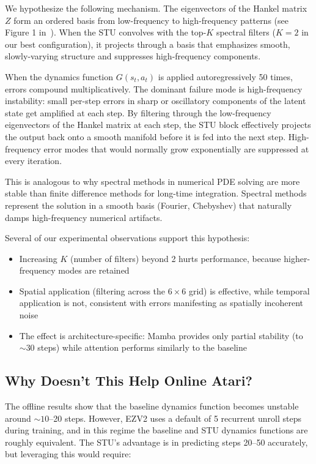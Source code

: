 \documentclass[10pt,twocolumn]{IEEEtran}
\begin{document}
We hypothesize the following mechanism. The eigenvectors of the Hankel matrix $Z$ form an ordered basis from low-frequency to high-frequency patterns (see Figure 1 in~\cite{agarwal2023spectral}). When the STU convolves with the top-$K$ spectral filters ($K=2$ in our best configuration), it projects through a basis that emphasizes smooth, slowly-varying structure and suppresses high-frequency components.

When the dynamics function $G(s_t, a_t)$ is applied autoregressively 50 times, errors compound multiplicatively. The dominant failure mode is high-frequency instability: small per-step errors in sharp or oscillatory components of the latent state get amplified at each step. By filtering through the low-frequency eigenvectors of the Hankel matrix at each step, the STU block effectively projects the output back onto a smooth manifold before it is fed into the next step. High-frequency error modes that would normally grow exponentially are suppressed at every iteration.

This is analogous to why spectral methods in numerical PDE solving are more stable than finite difference methods for long-time integration. Spectral methods represent the solution in a smooth basis (Fourier, Chebyshev) that naturally damps high-frequency numerical artifacts.

Several of our experimental observations support this hypothesis:
\begin{itemize}
    \item Increasing $K$ (number of filters) beyond 2 hurts performance, because higher-frequency modes are retained
    \item Spatial application (filtering across the $6 \times 6$ grid) is effective, while temporal application is not, consistent with errors manifesting as spatially incoherent noise
    \item The effect is architecture-specific: Mamba provides only partial stability (to ${\sim}30$ steps) while attention performs similarly to the baseline
\end{itemize}

\subsection{Why Doesn't This Help Online Atari?}

The offline results show that the baseline dynamics function becomes unstable around ${\sim}10$--20 steps. However, EZV2 uses a default of 5 recurrent unroll steps during training, and in this regime the baseline and STU dynamics functions are roughly equivalent. The STU's advantage is in predicting steps 20--50 accurately, but leveraging this would require:
\end{document}
